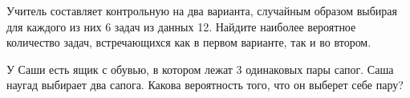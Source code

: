 \documentclass[a4paper,12pt]{article}
\begin{document}
  Учитель составляет контрольную на два варианта, случайным образом выбирая для каждого из них 6 задач из данных 12. Найдите наиболее вероятное количество задач, встречающихся как в первом варианте, так и во втором.

  У Саши есть ящик с обувью, в котором лежат 3 одинаковых пары сапог. Саша наугад выбирает два сапога. Какова вероятность того, что он выберет себе пару?







\vfill
{}
\end{document}
